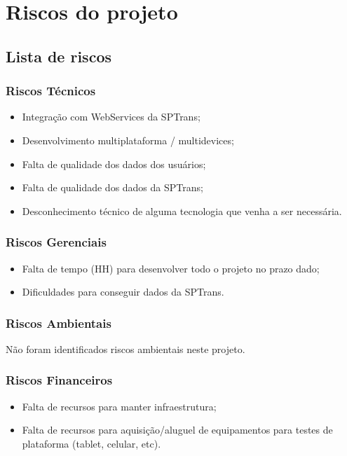 \section{Riscos do projeto}

\subsection{Lista de riscos}

\subsubsection{Riscos Técnicos}
\begin{itemize}
  \item Integração com WebServices da SPTrans;
  \item Desenvolvimento multiplataforma / multidevices;
  \item Falta de qualidade dos dados dos usuários;
  \item Falta de qualidade dos dados da SPTrans;
  \item Desconhecimento técnico de alguma tecnologia que venha a ser necessária.
\end{itemize}

\subsubsection{Riscos Gerenciais}
\begin{itemize}
  \item Falta de tempo (HH) para desenvolver todo o projeto no prazo dado;
  \item Dificuldades para conseguir dados da SPTrans.
\end{itemize}

\subsubsection{Riscos Ambientais}
Não foram identificados riscos ambientais neste projeto.

\subsubsection{Riscos Financeiros}
\begin{itemize}
  \item Falta de recursos para manter infraestrutura;
  \item Falta de recursos para aquisição/aluguel de equipamentos para testes de plataforma (tablet, celular, etc).
\end{itemize}

